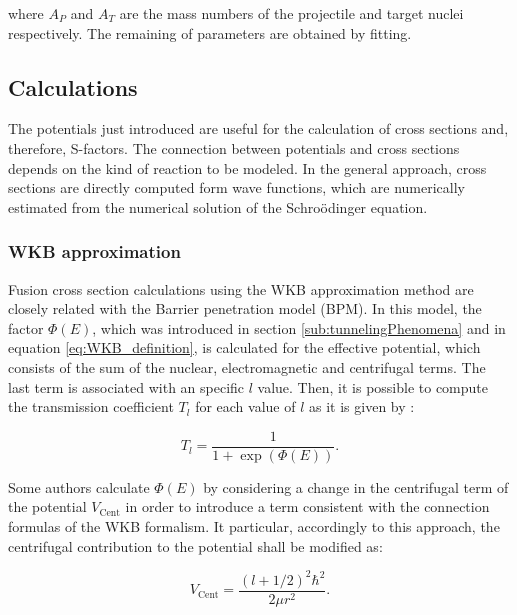 \documentclass[openany]{book}
\begin{document}
where $A_P$ and $A_T$ are the mass numbers of the projectile and target nuclei respectively. The remaining of parameters are obtained by fitting.


\subsection{Calculations}  \label{sub:potential_calculations}

The potentials just introduced are useful for the calculation of cross sections and, therefore, S-factors. The connection between potentials and cross sections depends on the kind of reaction to be modeled. In the general approach, cross sections are directly computed form wave functions,  which are numerically estimated from the numerical solution of the Schroödinger equation. \\

\subsubsection{WKB approximation} \label{ssub:potential_calculations_WKB}

Fusion cross section calculations using the WKB approximation method are closely related with the Barrier penetration model (BPM). In this model,  the factor $\Phi(E)$, which was introduced in section \ref{sub:tunnelingPhenomena} and in equation \ref{eq:WKB_definition}, is calculated for the effective potential, which consists of the sum of the nuclear, electromagnetic and centrifugal terms. The last term is associated with an specific $l$ value. Then, it is possible to compute the transmission coefficient $T_l$ for each value of $l$ as it is given by \cite{koyuncu_soylu_2018}:

\begin{equation} \label{eq:potential_WKB_transmission}
	T_l =  \frac{1}{1 + \exp ({\Phi(E)} )}.
\end{equation}

Some authors calculate $\Phi(E)$ by considering a change in the centrifugal term of the potential $V_{\mathrm{Cent}}$ in order to introduce a term consistent with the connection formulas of the WKB formalism. It particular, accordingly to this approach, the centrifugal contribution to the potential shall be modified as: 

\begin{equation} \label{eq:potential_WKB_modified_centrifugal}
	V_{\mathrm{Cent}} = \frac{(l + 1/2)^2 \hbar^2}{2\mu r^2}.
\end{equation}
\end{document}
